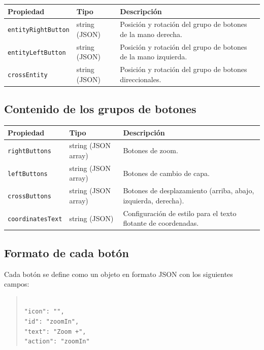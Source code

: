 \documentclass[a4paper, 12pt]{book}
\begin{document}
\begin{table}[H]
\centering
\begin{tabular}{|l|l|p{9cm}|}
\hline
\textbf{Propiedad} & \textbf{Tipo} & \textbf{Descripción} \\
\hline
\texttt{entityRightButton} & string (JSON) & Posición y rotación del grupo de botones de la mano derecha. \\
\texttt{entityLeftButton} & string (JSON) & Posición y rotación del grupo de botones de la mano izquierda. \\
\texttt{crossEntity} & string (JSON) & Posición y rotación del grupo de botones direccionales. \\
\hline
\end{tabular}
\end{table}

\subsection*{Contenido de los grupos de botones}

\begin{table}[H]
\centering
\begin{tabular}{|l|l|p{9cm}|}
\hline
\textbf{Propiedad} & \textbf{Tipo} & \textbf{Descripción} \\
\hline
\texttt{rightButtons} & string (JSON array) & Botones de zoom. \\
\texttt{leftButtons} & string (JSON array) & Botones de cambio de capa. \\
\texttt{crossButtons} & string (JSON array) & Botones de desplazamiento (arriba, abajo, izquierda, derecha). \\
\texttt{coordinatesText} & string (JSON) & Configuración de estilo para el texto flotante de coordenadas. \\
\hline
\end{tabular}
\end{table}

\subsection*{Formato de cada botón}

Cada botón se define como un objeto en formato JSON con los siguientes campos:

\begin{quote}
\small
\texttt{}\\
\quad \texttt{"icon": "",}\\
\quad \texttt{"id": "zoomIn",}\\
\quad \texttt{"text": "Zoom +",}\\
\quad \texttt{"action": "zoomIn"}\\
\texttt{}
\end{quote}
\end{document}
